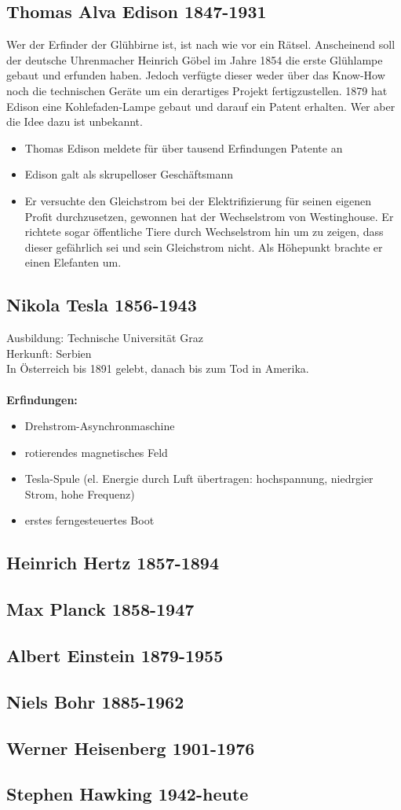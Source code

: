 \subsection{Thomas Alva Edison 		1847-1931}
	Wer der Erfinder der Glühbirne ist, ist nach wie vor ein Rätsel. Anscheinend soll der deutsche Uhrenmacher Heinrich Göbel im Jahre 1854 die erste Glühlampe gebaut und erfunden haben. Jedoch verfügte dieser weder über das Know-How noch die technischen Geräte um ein derartiges Projekt fertigzustellen. 1879 hat Edison eine Kohlefaden-Lampe gebaut und darauf ein Patent erhalten. Wer aber die Idee dazu ist unbekannt.
	\begin{itemize}
		\item Thomas Edison meldete für über tausend Erfindungen Patente an
		\item Edison galt als skrupelloser Geschäftsmann
		\item Er versuchte den Gleichstrom bei der Elektrifizierung für seinen eigenen Profit durchzusetzen, gewonnen hat der Wechselstrom von Westinghouse. Er richtete sogar öffentliche Tiere durch Wechselstrom hin um zu zeigen, dass dieser gefährlich sei und sein Gleichstrom nicht. Als Höhepunkt brachte er einen Elefanten um.
	\end{itemize}
\subsection{Nikola Tesla 				1856-1943}
	Ausbildung: Technische Universität Graz\\
	Herkunft: Serbien\\
	In Österreich bis 1891 gelebt, danach bis zum Tod in Amerika. \\\\
	\textbf{Erfindungen:}
	\begin{itemize}
		\item Drehstrom-Asynchronmaschine
		\item rotierendes magnetisches Feld
		\item Tesla-Spule (el. Energie durch Luft übertragen: hochspannung, niedrgier Strom, hohe Frequenz)
		\item erstes ferngesteuertes Boot
	\end{itemize}
	
\subsection{Heinrich Hertz 			1857-1894}
\subsection{Max Planck 				1858-1947}
\subsection{Albert Einstein 			1879-1955}
\subsection{Niels Bohr 				1885-1962}
\subsection{Werner Heisenberg 			1901-1976}
\subsection{Stephen Hawking 			1942-heute}